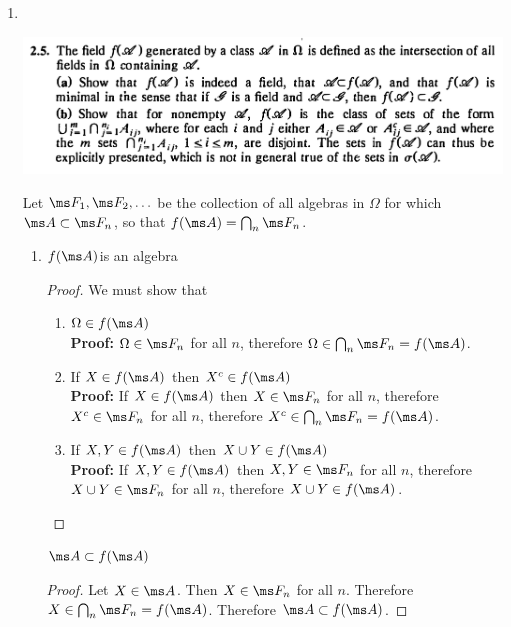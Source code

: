 \begin{enumerate}
\newpage
\item~\\
  \begin{mdframed}
    \includegraphics[width=400pt]{img/analysis--berkeley-202a-hw-ab18.png}
  \end{mdframed}
  Let $\ms F_1, \ms F_2, \ldots$ be the collection of all algebras in $\Omega$ for which $\ms A \subset \ms F_n$,
  so that $f(\ms A) = \bigcap_{n}\ms F_n$.

  \begin{enumerate}[label=(\alph*)]

  \item
    \begin{claim*}
      $f(\ms A)$is an algebra
    \end{claim*}
    \begin{proof}
      We must show that
      \begin{enumerate}
      \item $\Omega \in f(\ms A)$\\
        {\bf Proof:} $\Omega \in \ms F_n$ for all $n$, therefore $\Omega \in \bigcap_{n}\ms F_n = f(\ms A)$.

      \item If $X \in f(\ms A)$ then $X^c \in f(\ms A)$\\
        {\bf Proof:} If $X \in f(\ms A)$ then $X \in \ms F_n$ for all $n$, therefore $X^c \in \ms F_n$ for all $n$, therefore $X^c \in \bigcap_{n}\ms F_n = f(\ms A)$.

      \item If $X, Y \in f(\ms A)$ then $X \cup Y \in f(\ms A)$\\
        {\bf Proof:} If $X, Y \in f(\ms A)$ then $X, Y \in \ms F_n$ for all $n$, therefore $X \cup Y \in \ms F_n$ for all $n$, therefore $X \cup Y \in f(\ms A)$.
      \end{enumerate}
    \end{proof}

    \begin{claim*}
      $\ms A \subset f(\ms A)$
    \end{claim*}
    \begin{proof}
      Let $X \in \ms A$. Then $X \in \ms F_n$ for all $n$. Therefore $X \in \bigcap_{n}\ms F_n = f(\ms A)$. Therefore $\ms A \subset f(\ms A)$.
    \end{proof}


\end{enumerate}
\end{enumerate}
